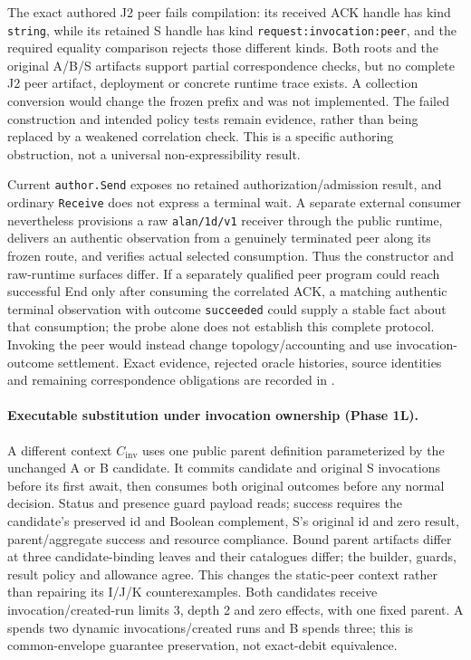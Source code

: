 \documentclass[11pt,a4paper]{article}
\theoremstyle{definition}
\theoremstyle{remark}
\begin{document}
The exact authored J2 peer fails compilation: its received ACK handle has kind \texttt{string}, while its retained S handle has kind \texttt{request:invocation:peer}, and the required equality comparison rejects those different kinds. Both roots and the original A/B/S artifacts support partial correspondence checks, but no complete J2 peer artifact, deployment or concrete runtime trace exists. A collection conversion would change the frozen prefix and was not implemented. The failed construction and intended policy tests remain evidence, rather than being replaced by a weakened correlation check. This is a specific authoring obstruction, not a universal non-expressibility result.

Current \texttt{author.Send} exposes no retained authorization/admission result, and ordinary \texttt{Receive} does not express a terminal wait. A separate external consumer nevertheless provisions a raw \texttt{alan/1d/v1} receiver through the public runtime, delivers an authentic observation from a genuinely terminated peer along its frozen route, and verifies actual selected consumption. Thus the constructor and raw-runtime surfaces differ. If a separately qualified peer program could reach successful End only after consuming the correlated ACK, a matching authentic terminal observation with outcome \texttt{succeeded} could supply a stable fact about that consumption; the probe alone does not establish this complete protocol. Invoking the peer would instead change topology/accounting and use invocation-outcome settlement. Exact evidence, rejected oracle histories, source identities and remaining correspondence obligations are recorded in .

\paragraph{Executable substitution under invocation ownership (Phase 1L).} A different context $C_{\mathrm{inv}}$ uses one public parent definition parameterized by the unchanged A or B candidate. It commits candidate and original S invocations before its first await, then consumes both original outcomes before any normal decision. Status and presence guard payload reads; success requires the candidate's preserved id and Boolean complement, S's original id and zero result, parent/aggregate success and resource compliance. Bound parent artifacts differ at three candidate-binding leaves and their catalogues differ; the builder, guards, result policy and allowance agree. This changes the static-peer context rather than repairing its I/J/K counterexamples. Both candidates receive invocation/created-run limits 3, depth 2 and zero effects, with one fixed parent. A spends two dynamic invocations/created runs and B spends three; this is common-envelope guarantee preservation, not exact-debit equivalence.
\end{document}
